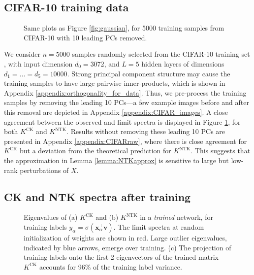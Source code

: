 \documentclass{article}
\theoremstyle{definition}
\newcommand{\CK}{\text{CK}}
\newcommand{\NTK}{\text{NTK}}
\newcommand{\x}{\mathbf{x}}
\renewcommand{\v}{\mathbf{v}}
\renewcommand{\a}{\alpha}
\newcommand{\1}{\mathbf{1}}
\begin{document}
\subsection{CIFAR-10 training data}\label{sec:CIFAR}

\begin{figure}
%
%
\caption{Same plots as Figure \ref{fig:gaussian}, for 5000 training 
samples from CIFAR-10 with 10 leading PCs removed.}
\label{fig:CIFAR}
\end{figure}

We consider $n=5000$ samples randomly selected from the CIFAR-10
training set \cite{krizhevsky2009learning}, with
input dimension $d_0=3072$, and $L=5$ hidden layers of
dimensions $d_1=\ldots=d_5=10000$. Strong principal component
structure may cause the training samples to have large pairwise inner-products, which is shown in Appendix \ref{appendix:orthogonality_for_data}.
Thus, we pre-process the training samples by removing the leading 10 PCs---a few
example images before and after this removal are depicted in
Appendix \ref{appendix:CIFAR_images}.
A close agreement between the observed and limit
spectra is displayed in Figure \ref{fig:CIFAR}, for both $K^\CK$ and $K^\NTK$.
Results without removing these leading 10 PCs are
presented in Appendix \ref{appendix:CIFARraw}, where there is close
agreement for $K^\CK$ but a deviation from the theoretical prediction
for $K^\NTK$. This suggests that the approximation in
Lemma \ref{lemma:NTKapprox} is sensitive to large but low-rank
perturbations of $X$. 

\subsection{CK and NTK spectra after training}\label{sec:training}

\begin{figure}
%
%
\caption{Eigenvalues of (a) $K^\CK$ and (b) $K^\NTK$ in a \emph{trained}
network, for training labels $y_\a=\sigma(\x_\a^\top \v)$. The limit spectra at
random initialization of weights are shown in red. Large outlier eigenvalues,
indicated by blue arrows, emerge over training. (c) The projection of training
labels onto the first 2 eigenvectors of the trained matrix $K^\CK$ accounts
for 96\% of the training label variance.}\label{fig:training}
\end{figure}
\end{document}
